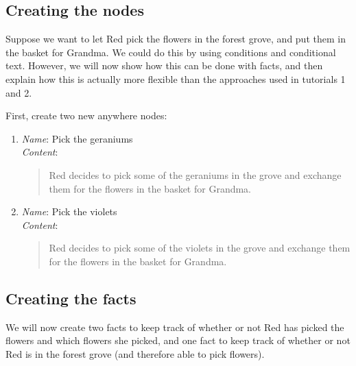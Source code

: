 \documentclass{article}
\begin{document}
\subsection{Creating the nodes}

Suppose we want to let Red pick the flowers in the forest grove, and put them in the basket for Grandma. We could do this by using conditions and conditional text. However, we will now show how this can be done with facts, and then explain how this is actually more flexible than the approaches used in tutorials 1 and 2.

First, create two new anywhere nodes:

\begin{enumerate}
  \item \textit{Name}: Pick the geraniums\\
  \textit{Content}: 
  \begin{quotation}
  \noindent Red decides to pick some of the geraniums in the grove and exchange them for the flowers in the basket for Grandma.
  \end{quotation}
  \item \textit{Name}: Pick the violets\\
  \textit{Content}: 
  \begin{quotation}
  \noindent Red decides to pick some of the violets in the grove and exchange them for the flowers in the basket for Grandma.
  \end{quotation}
\end{enumerate}

\subsection{Creating the facts}

We will now create two facts to keep track of whether or not Red has picked the flowers and which flowers she picked, and one fact to keep track of whether or not Red is in the forest grove (and therefore able to pick flowers).
\end{document}
